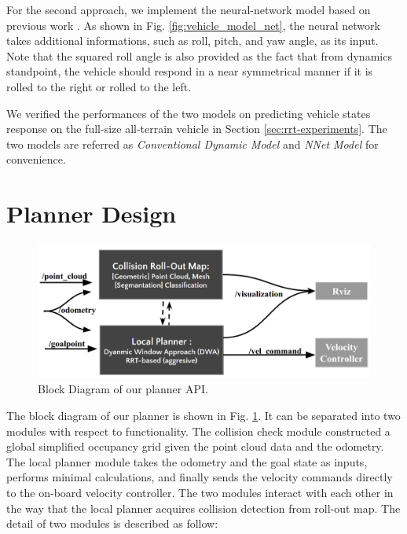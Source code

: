 \documentclass[../thesis.tex]{subfiles}
\begin{document}
For the second approach, we implement the neural-network model based on previous work \cite{bode2007learning}. As shown in Fig. \ref{fig:vehicle_model_net}, the neural network takes additional informations, such as roll, pitch, and yaw angle, as its input. Note that the squared roll angle is also provided as the fact that from dynamics standpoint, the vehicle should respond in a near symmetrical manner if it is rolled to the right or rolled to the left. 

We verified the performances of the two models on predicting vehicle states response on the full-size all-terrain vehicle in Section \ref{sec:rrt-experiments}. The two models are referred as \textit{Conventional Dynamic Model} and \textit{NNet Model} for convenience. 


\section{Planner Design} \label{sec:rrt-planner}


\begin{figure}[t]
	\begin{center}
		\centerline{\includegraphics[width=0.8\columnwidth]{./RRTPlanner/fig/planner_module.png}}
		\caption{Block Diagram of our planner API.}
		\label{fig:planner_module}
	\end{center}
\end{figure} 

The block diagram of our planner is shown in Fig. \ref{fig:planner_module}. It can be separated into two modules with respect to functionality. The collision check module constructed a global simplified occupancy grid given the point cloud data and the odometry. The local planner module takes the odometry and the goal state as inputs, performs minimal calculations, and finally sends the velocity commands directly to the on-board velocity controller.
The two modules interact with each other in the way that the local planner acquires collision detection from roll-out map.
The detail of two modules is described as follow:
\end{document}
